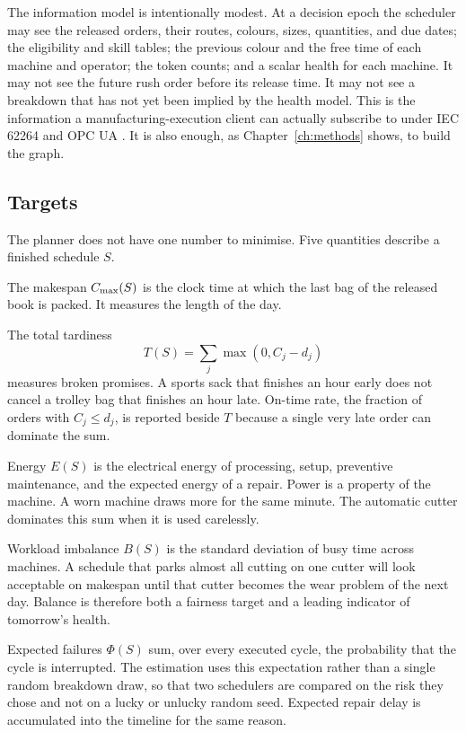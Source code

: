 The information model is intentionally modest. At a decision epoch the scheduler may see the released orders, their routes, colours, sizes, quantities, and due dates; the eligibility and skill tables; the previous colour and the free time of each machine and operator; the token counts; and a scalar health for each machine. It may not see the future rush order before its release time. It may not see a breakdown that has not yet been implied by the health model. This is the information a manufacturing-execution client can actually subscribe to under IEC 62264 and OPC UA \cite{iec62264,iec62541}. It is also enough, as Chapter~\ref{ch:methods} shows, to build the graph.

\subsection{Targets}

The planner does not have one number to minimise. Five quantities describe a finished schedule \(S\).

The makespan \(C_{\max}(S)\) is the clock time at which the last bag of the released book is packed. It measures the length of the day.

The total tardiness
\begin{equation}
T(S) = \sum_j \max(0, C_j - d_j)
\label{eq:tard-problem}
\end{equation}
measures broken promises. A sports sack that finishes an hour early does not cancel a trolley bag that finishes an hour late. On-time rate, the fraction of orders with \(C_j \le d_j\), is reported beside \(T\) because a single very late order can dominate the sum.

Energy \(E(S)\) is the electrical energy of processing, setup, preventive maintenance, and the expected energy of a repair. Power is a property of the machine. A worn machine draws more for the same minute. The automatic cutter dominates this sum when it is used carelessly.

Workload imbalance \(B(S)\) is the standard deviation of busy time across machines. A schedule that parks almost all cutting on one cutter will look acceptable on makespan until that cutter becomes the wear problem of the next day. Balance is therefore both a fairness target and a leading indicator of tomorrow's health.

Expected failures \(\Phi(S)\) sum, over every executed cycle, the probability that the cycle is interrupted. The estimation uses this expectation rather than a single random breakdown draw, so that two schedulers are compared on the risk they chose and not on a lucky or unlucky random seed. Expected repair delay is accumulated into the timeline for the same reason.

